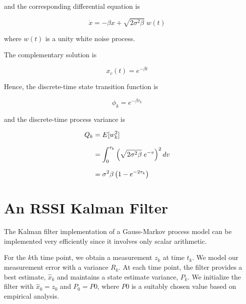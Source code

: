 \documentclass[12pt]{article}
\begin{document}
and the corresponding differential equation is

\begin{equation}
    \dot{x} = - \beta x + \sqrt{2 \sigma^2 \beta} \; w(t)
    \label{eq:GM-differential-equation}
\end{equation}

where $w(t)$ is a unity white noise process.

The complementary solution is

\begin{equation}
    x_c(t) = e^{-\beta t}
    \label{eq:GM-complementary-solution}
\end{equation}

Hence, the discrete-time state transition function is

\begin{equation}
    \phi_k = e^{-\beta \tau_k}
    \label{eq:GM-state-transition}
\end{equation}

and the discrete-time process variance is

\begin{equation}
    \setlength{\jot}{10pt}
    \begin{aligned}
    Q_k &= E[w_k^2] \\
        &= \int_0^{\tau_k} \left ( \sqrt{2 \sigma^2 \beta} \; e^{-v} \right ) ^ 2 dv \\
        &= \sigma^2 \beta \left ( 1 - e^{-2 \tau_k} \right )
    \end{aligned}
    \label{eq:GM-process-variance}
\end{equation}



%
%

\section{An RSSI Kalman Filter}

The Kalman filter implementation of a Gauss-Markov process model can be implemented
very efficiently since it involves only scalar arithmetic.

For the $k$th time point, we obtain a measurement $z_k$ at time $t_k$. We model our
measurement error with a variance $R_k$. At each time point, the filter provides a best
estimate, $\hat{x}_k$ and maintains a state estimate variance, $P_k$. We initialize the
filter with $\hat{x}_0 = z_0$ and $P_0 = P0$, where $P0$ is a suitably chosen value based
on empirical analysis.
\end{document}
